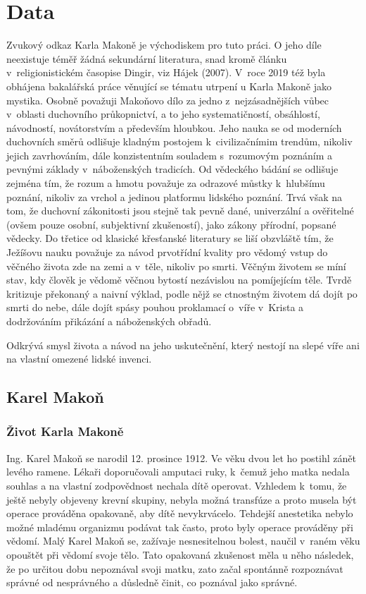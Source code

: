 \chapter{Data}
\label{kap:data}

Zvukový odkaz Karla Makoně je východiskem pro tuto práci. O jeho
díle neexistuje téměř žádná sekundární literatura, snad kromě článku
v~religionistickém časopise Dingir, viz Hájek (2007)\cite{hajek2007cesky}.
V~roce 2019 též byla obhájena bakalářská práce věnující se tématu utrpení u
Karla Makoně jako mystika\cite{mullerova2019vypravveni}. Osobně
považuji Makoňovo dílo za jedno z~nejzásadnějších vůbec v~oblasti duchovního
průkopnictví, a to jeho systematičností, obsáhlostí, návodností, novátorstvím a
především hloubkou. Jeho nauka se od moderních duchovních směrů odlišuje kladným
postojem k~civilizačnímim trendům, nikoliv jejich zavrhováním, dále
konzistentním souladem s~rozumovým poznáním a pevnými základy v~náboženských
tradicích. Od vědeckého bádání se odlišuje zejména tím, že rozum a hmotu
považuje za odrazové můstky k~hlubšímu poznání, nikoliv za vrchol a jedinou
platformu lidského poznání. Trvá však na tom, že duchovní zákonitosti jsou
stejně tak pevně dané, univerzální a ověřitelné (ovšem pouze osobní, subjektivní
zkušeností), jako zákony přírodní, popsané vědecky. Do třetice od klasické
křesťanské literatury se liší obzvláště tím, že Ježíšovu nauku považuje za návod
prvotřídní kvality pro vědomý vstup do věčného života zde na zemi a v~těle,
nikoliv po smrti. Věčným životem se míní stav, kdy člověk je vědomě věčnou
bytostí nezávislou na pomíjejícím těle. Tvrdě kritizuje překonaný a naivní
výklad, podle nějž se ctnostným životem dá dojít po smrti do nebe, dále dojít
spásy pouhou proklamací o~víře v~Krista a dodržováním přikázání a náboženských
obřadů.

Odkrývá smysl života a návod na jeho uskutečnění, který nestojí na slepé víře
ani na vlastní omezené lidské invenci.

\section{Karel Makoň}

\subsection{Život Karla Makoně}

Ing. Karel Makoň se narodil 12. prosince 1912. Ve věku dvou let ho postihl zánět
levého ramene. Lékaři doporučovali amputaci ruky, k~čemuž jeho matka nedala
souhlas a na vlastní zodpovědnost nechala dítě operovat. Vzhledem k~tomu, že
ještě nebyly objeveny krevní skupiny, nebyla možná transfúze a proto musela být
operace prováděna opakovaně, aby dítě nevykrvácelo. Tehdejší anestetika nebylo
možné mladému organizmu podávat tak často, proto byly operace prováděny při
vědomí. Malý Karel Makoň se, zažívaje nesnesitelnou bolest, naučil v~raném věku
opouštět při vědomí svoje tělo. Tato opakovaná zkušenost měla u něho následek, že po
určitou dobu nepoznával svoji matku, zato začal spontánně rozpoznávat správné od
nesprávného a důsledně činit, co poznával jako správné.

